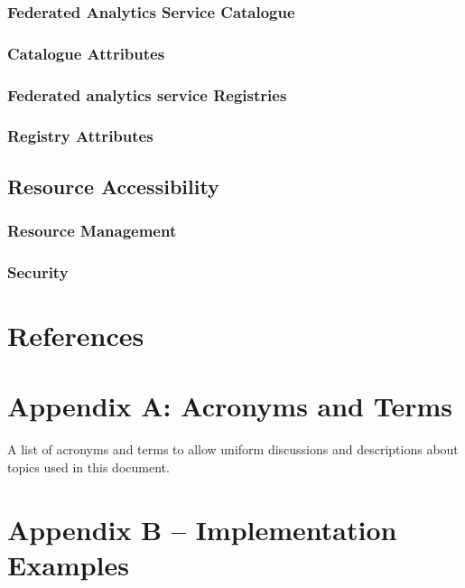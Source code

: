 \documentclass[12pt]{article}
\begin{document}
\subsubsection{Federated Analytics Service Catalogue}
\subsubsection{Catalogue Attributes}
\subsubsection{Federated analytics service Registries}
\subsubsection{Registry Attributes}

\subsection{Resource Accessibility}
\subsubsection{Resource Management}
\subsubsection{Security}




\section*{References}




\section*{Appendix A: Acronyms and Terms}

A list of acronyms and terms to allow uniform discussions and descriptions about topics used in this document.

\begin{quote}
    
\end{quote}



\section*{Appendix B – Implementation Examples}
\end{document}
